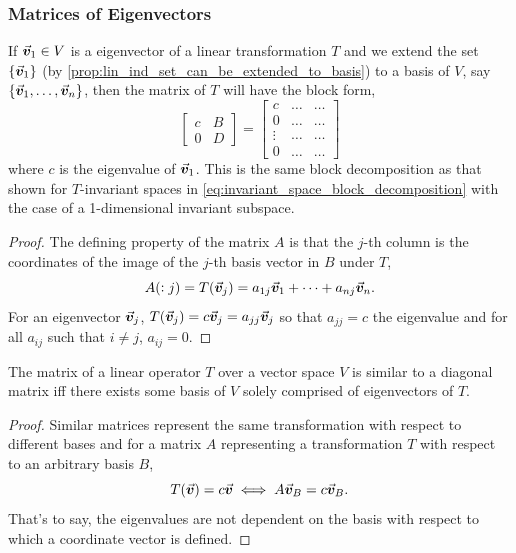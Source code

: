 \documentclass[MathsNotesBase.tex]{subfiles}
\begin{document}
{ 		\bigskip
 		\subsubsection{Matrices of Eigenvectors}
 		\bigskip
 		If ${ \vec{\bm{v}}_1 \in V }$ is a eigenvector of a linear transformation $T$ and we extend the set ${ \{\vec{\bm{v}}_1\} }$ (by \autoref{prop:lin_ind_set_can_be_extended_to_basis}) to a basis of $V$, say ${ \{\vec{\bm{v}}_1,\dots,\vec{\bm{v}}_n\} }$, then the matrix of $T$ will have the block form,
 		\[
 			\begin{bmatrix}
 			c & B\\
 			0 & D
 			\end{bmatrix} =
 			\begin{bmatrix}
 			c & \dots & \dots\\
 			0 & \dots & \dots\\
 			\vdots & \dots & \dots\\
 			0 & \dots & \dots
 			\end{bmatrix}
 		\]
 		where $c$ is the eigenvalue of $\vec{\bm{v}}_1$. This is the same block decomposition as that shown for $T$-invariant spaces in \ref{eq:invariant_space_block_decomposition} with the case of a 1-dimensional invariant subspace.
 		
 		\medskip
 		\begin{proof}
 			The defining property of the matrix $A$ is that the $j$-th column is the coordinates of the image of the $j$-th basis vector in $B$ under $T$,
 			\[ A(:j) = T(\vec{\bm{v}}_j) = a_{1j}\vec{\bm{v}}_1 + \cdots + a_{nj}\vec{\bm{v}}_n. \]
 			For an eigenvector $\vec{\bm{v}}_j$, ${ T(\vec{\bm{v}}_j) = c\vec{\bm{v}}_j = a_{jj}\vec{\bm{v}}_j }$ so that ${ a_{jj} = c }$ the eigenvalue and for all ${ a_{ij} }$ such that ${ i \neq j }$, ${ a_{ij} = 0 }$. 
 		\end{proof}
 		\begin{corollary}
 			\label{coro:diagonal-similar-matrix-iff-exists-basis-of-eigenvectors}
 			The matrix of a linear operator $T$ over a vector space $V$ is similar to a diagonal matrix iff there exists some basis of $V$ solely comprised of eigenvectors of $T$. 
 		\end{corollary}
 	
 		\bigskip
 		\begin{proof}
 			Similar matrices represent the same transformation with respect to different bases and for a matrix $A$ representing a transformation $T$ with respect to an arbitrary basis $B$,
 			\[ T(\vec{\bm{v}}) = c\vec{\bm{v}} \iff A\vec{\bm{v}}_B = c\vec{\bm{v}}_B. \]
 			That's to say, the eigenvalues are not dependent on the basis with respect to which a coordinate vector is defined.
 		\end{proof}
	}
\end{document}
